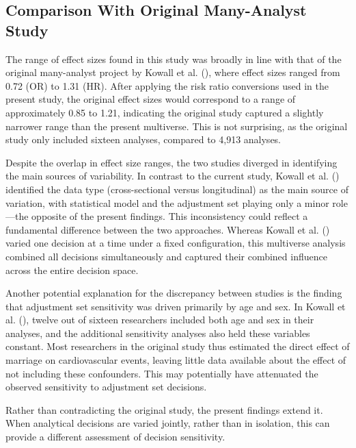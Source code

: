 \documentclass[
  man,
  floatsintext,
  longtable,
  nolmodern,
  notxfonts,
  notimes,
  colorlinks=true,linkcolor=blue,citecolor=blue,urlcolor=blue]{apa7}
\begin{document}
\subsection{Comparison With Original Many-Analyst
Study}\label{comparison-with-original-many-analyst-study}

The range of effect sizes found in this study was broadly in line with
that of the original many-analyst project by Kowall et al.
(), where effect sizes ranged
from 0.72 (OR) to 1.31 (HR). After applying the risk ratio conversions
used in the present study, the original effect sizes would correspond to
a range of approximately 0.85 to 1.21, indicating the original study
captured a slightly narrower range than the present multiverse. This is
not surprising, as the original study only included sixteen analyses,
compared to 4,913 analyses.

Despite the overlap in effect size ranges, the two studies diverged in
identifying the main sources of variability. In contrast to the current
study, Kowall et al. ()
identified the data type (cross-sectional versus longitudinal) as the
main source of variation, with statistical model and the adjustment set
playing only a minor role---the opposite of the present findings. This
inconsistency could reflect a fundamental difference between the two
approaches. Whereas Kowall et al.
() varied one decision at a time
under a fixed configuration, this multiverse analysis combined all
decisions simultaneously and captured their combined influence across
the entire decision space.

Another potential explanation for the discrepancy between studies is the
finding that adjustment set sensitivity was driven primarily by age and
sex. In Kowall et al. (), twelve
out of sixteen researchers included both age and sex in their analyses,
and the additional sensitivity analyses also held these variables
constant. Most researchers in the original study thus estimated the
direct effect of marriage on cardiovascular events, leaving little data
available about the effect of not including these confounders. This may
potentially have attenuated the observed sensitivity to adjustment set
decisions.

Rather than contradicting the original study, the present findings
extend it. When analytical decisions are varied jointly, rather than in
isolation, this can provide a different assessment of decision
sensitivity.
\end{document}
